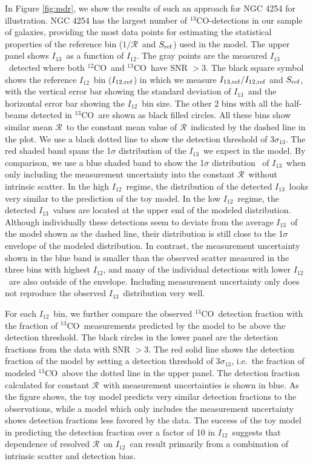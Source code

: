 \documentclass{emulateapj}
\def\ttco{\mbox{$^{13}$CO}}
\def\twco{\mbox{$^{12}$CO}}
\def\rtt{$\mathcal{R}$}
\def\itw{$I_{12}$}
\def\itt{$I_{13}$}
\begin{document}
In Figure \ref{fig:mdr}, we show the results of such an approach 
for NGC 4254 for illustration.
NGC 4254 has the largest number of \ttco-detections in our sample of
galaxies, providing the most data points for estimating
the statistical properties of the reference bin
($1/$\rtt\ and $S_{\rm ref}$) 
used in the model.
The upper panel shows \itt \  as a function of \itw.
The gray points are the measured \itt\  detected where both 
\twco \ and \ttco \ have SNR $> 3$.  
The black square symbol shows the reference \itw \ bin ($I_{12, \rm
  ref}$) in which we measure  $I_{13,\mathrm{ref}}/I_{12,\rm ref}$ and $S_{\rm ref}$,  
with the vertical error bar showing the standard deviation of \itt \  and the 
horizontal error bar showing the \itw \ bin size.
The other 2 bins with all the half-beams  detected in \ttco \ are shown as black filled circles. All these bins show similar mean \rtt \ to the constant mean value of \rtt \  
indicated by the dashed line in the plot.
We use a black dotted line to show the detection threshold of $3\sigma_{13}$. The red shaded band spans the 1$\sigma$ distribution of the
\itt \ we expect in the model. By comparison, we use a blue shaded band to show the 1$\sigma$ distribution \ of \itt \ when only including the measurement uncertainty into the constant \rtt \ without intrinsic scatter. 
In the high \itw \ regime, 
the distribution of the detected \itt \ looks very similar to the prediction of the toy model.
In the low \itw \ regime, the detected \itt \ values are located at the upper 
end of the modeled distribution. 
Although individually these detections seem to deviate from the
average \itt \ of the model shown as the dashed line, 
their distribution is still close to the 1$\sigma$ envelope of the modeled distribution.   
In contrast, the measurement uncertainty shown in the blue band is smaller than the observed scatter measured in the three bins with highest \itw, and many of the individual detections with lower \itw \ are also outside of the envelope. 
Including measurement uncertainty only does not reproduce the 
observed \itt \ distribution very well.

For each \itw \ bin, we further compare the 
observed \ttco \ detection fraction
with the fraction of \ttco \ measurements predicted by the model to be 
above the detection threshold. 
The black circles in the lower panel are the detection fractions 
from the data with SNR $> 3$. 
The red solid line shows the detection fraction 
of the model by setting a detection threshold of
$3\sigma_{13}$, 
i.e.\ the fraction of modeled \ttco \ above the 
dotted line in the upper panel. 
The detection fraction calculated for constant \rtt \ with measurement uncertainties is shown in blue.
As the figure shows, the toy model predicts very similar detection fractions 
to the observations, while a model which only includes the measurement uncertainty shows detection fractions less favored by the data. 
The success of the toy model in predicting the detection fraction 
over a factor of 10 in \itw \ suggests that 
dependence of resolved \rtt \ on \itw \  can result primarily from  
a combination of intrinsic scatter and detection bias. 
\end{document}
